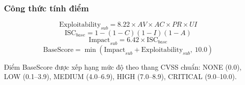 \subsubsection{Công thức tính điểm}

\[
    \mathrm{Exploitability}_{sub} = 8.22 \times AV \times AC \times PR \times UI
\]
\[
    \mathrm{ISC}_{base} = 1 - (1-C)(1-I)(1-A)
\]
\[
    \mathrm{Impact}_{sub} = 6.42 \times \mathrm{ISC}_{base}
\]
\[
    \mathrm{BaseScore} = \min(\mathrm{Impact}_{sub} + \mathrm{Exploitability}_{sub},\ 10.0)
\]

Điểm BaseScore được xếp hạng mức độ theo thang CVSS chuẩn: NONE (0.0), LOW
(0.1--3.9), MEDIUM (4.0--6.9), HIGH (7.0--8.9), CRITICAL (9.0--10.0).
